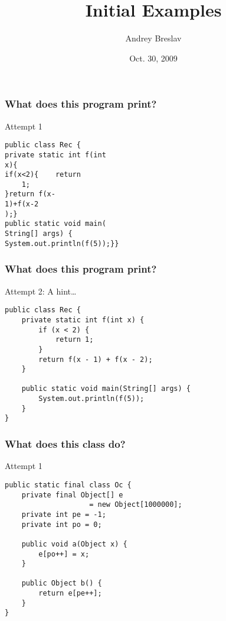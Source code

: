 \documentclass[screen]{beamer}
\title{Initial Examples}
\author{Andrey Breslav}
\institute{ITMO University, St. Petersburg / University of Tartu}
\date{Oct. 30, 2009}
\begin{document}

\begin{frame}[t,fragile]
\frametitle{What does this program print?}%
\begin{block}{Attempt 1}
\begin{center}%
\begin{lstlisting}
public class Rec {
private static int f(int 
x){
if(x<2){    return 
	1;
}return f(x- 
1)+f(x-2
);}
public static void main(
String[] args) {
System.out.println(f(5));}}
\end{lstlisting}%
\end{center}%
\end{block}
\end{frame}

\begin{frame}[t,fragile]
\frametitle{What does this program print?}%
%
\begin{block}{Attempt 2: A hint\ldots}%
\begin{lstlisting}
public class Rec {
    private static int f(int x) {
		if (x < 2) {
			return 1;
		}
		return f(x - 1) + f(x - 2);
	}

	public static void main(String[] args) {
		System.out.println(f(5));
	}
}
\end{lstlisting}%
\end{block}%
\end{frame}

\begin{frame}[c,fragile]
\frametitle{What does this class do?}%
%
\begin{block}{Attempt 1}%
\begin{lstlisting}
public static final class Oc {
	private final Object[] e 
					= new Object[1000000];
	private int pe = -1;
	private int po = 0;

	public void a(Object x) {
		e[po++] = x;
	}

	public Object b() {
		return e[pe++];
	}
}
\end{lstlisting}%
\end{block}%

\end{frame}
\end{document}
